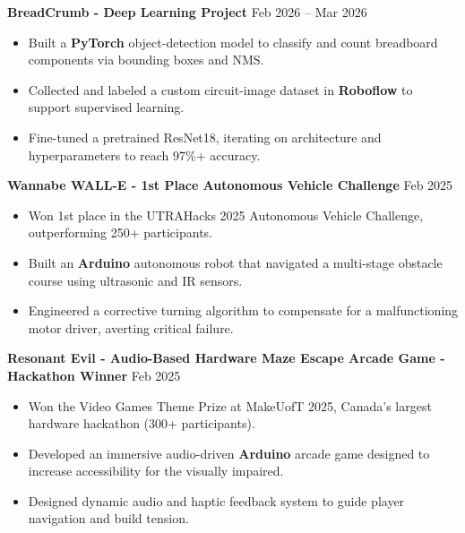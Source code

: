 \documentclass[10pt,letterpaper]{article}
\begin{document}
\textbf{BreadCrumb - Deep Learning Project} \hfill Feb 2026 -- Mar 2026 \\
\begin{itemize}
    \item Built a \textbf{PyTorch} object-detection model to classify and count breadboard components via bounding boxes and NMS.
    \item Collected and labeled a custom circuit-image dataset in \textbf{Roboflow} to support supervised learning.
    \item Fine-tuned a pretrained ResNet18, iterating on architecture and hyperparameters to reach 97\%+ accuracy.
\end{itemize}

\textbf{Wannabe WALL-E - 1st Place Autonomous Vehicle Challenge} \hfill Feb 2025 \\
\begin{itemize}
    \item Won 1st place in the UTRAHacks 2025 Autonomous Vehicle Challenge, outperforming 250+ participants. 
    \item Built an \textbf{Arduino} autonomous robot that navigated a multi-stage obstacle course using ultrasonic and IR sensors.
    \item Engineered a corrective turning algorithm to compensate for a malfunctioning motor driver, averting critical failure. 
\end{itemize}


\textbf{Resonant Evil - Audio-Based Hardware Maze Escape Arcade Game - Hackathon Winner} \hfill Feb 2025 \\
\begin{itemize}
    \item Won the Video Games Theme Prize at MakeUofT 2025, Canada's largest hardware hackathon (300+ participants). 
    \item Developed an immersive audio-driven \textbf{Arduino} arcade game designed to increase accessibility for the visually impaired.
    \item Designed dynamic audio and haptic feedback system to guide player navigation and build tension. 
\end{itemize}
\end{document}
